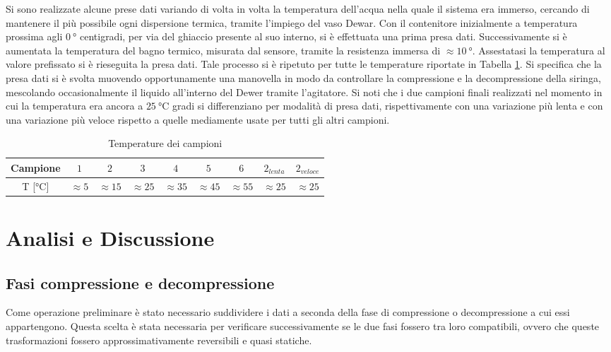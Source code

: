 \documentclass[a4paper,11pt,oneside]{article}
\begin{document}
Si sono realizzate alcune prese dati variando di volta in volta la temperatura dell'acqua nella quale il sistema era immerso, cercando di mantenere il più possibile ogni dispersione termica, tramite l'impiego del vaso Dewar. Con il contenitore inizialmente a temperatura prossima agli $\SI{0}{\degree}$ centigradi, per via del ghiaccio presente al suo interno, si è effettuata una prima presa dati. Successivamente si è aumentata la temperatura del bagno termico, misurata dal sensore, tramite la resistenza immersa di $\approx\SI{10}{\degree}$. Assestatasi la temperatura al valore prefissato si è rieseguita la presa dati. Tale processo si è ripetuto per tutte le temperature riportate in Tabella \ref{tab:camp_temp}. Si specifica che la presa dati si è svolta muovendo opportunamente una manovella in modo da controllare la compressione e la decompressione della siringa, mescolando occasionalmente il liquido all'interno del Dewer tramite l'agitatore. Si noti che i due campioni finali realizzati nel momento in cui la temperatura era ancora a $\SI{25}{\celsius}$ gradi si differenziano per modalità di presa dati, rispettivamente con una variazione più lenta e con una variazione più veloce rispetto a quelle mediamente usate per tutti gli altri campioni.

\begin{table}[h!]
    \centering
    \begin{tabular}{|c|c|c|c|c|c|c|c|c|}
        \hline
        Campione & $1$ & $2$ & $3$ & $4$ & $5$ & $6$ & $2_{lenta}$ & $2_{veloce}$\\\hline
        T [$\si{\celsius}$] & $\approx5$ & $\approx15$ & $\approx25$ & $\approx35$ & $\approx45$ & $\approx55$ & $\approx25$ & $\approx25$ \\\hline
    \end{tabular}
    \caption{Temperature dei campioni}
    \label{tab:camp_temp}
\end{table}



\section{Analisi e Discussione}
\subsection{Fasi compressione e decompressione}
Come operazione preliminare è stato necessario suddividere i dati a seconda della fase di compressione o decompressione a cui essi appartengono. Questa scelta è stata necessaria per verificare successivamente se le due fasi fossero tra loro compatibili, ovvero che queste trasformazioni fossero approssimativamente reversibili e quasi statiche.
\end{document}
